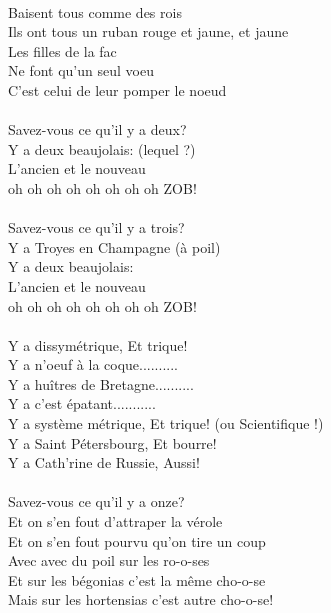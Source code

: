 
\\Baisent tous comme des rois
\\Ils ont tous un ruban rouge et jaune, et jaune
\\Les filles de la fac
\\Ne font qu'un seul voeu
\\C'est celui de leur pomper le noeud
\\\\Savez-vous ce qu'il y a deux? ~~~~~~~\bissimple
\\Y a deux beaujolais: (lequel ?)
\\L'ancien et le nouveau
\\oh oh oh oh oh oh oh oh ZOB!
\\\\Savez-vous ce qu'il y a trois? ~~~~~~~\bissimple
\\Y a Troyes en Champagne (à poil)
\\Y a deux beaujolais:
\\L'ancien et le nouveau
\\oh oh oh oh oh oh oh oh ZOB!
\\\\Y a dissymétrique, Et trique!
\\Y a n'oeuf à la coque..........
\\Y a huîtres de Bretagne..........
\\Y a c'est épatant...........
\\Y a système métrique, Et trique! (ou Scientifique !)
\\Y a Saint Pétersbourg, Et bourre!
\\Y a Cath'rine de Russie, Aussi!
\\\\Savez-vous ce qu'il y a onze? ~~~~~~~~~~~~~~\bissimple
\\Et on s'en fout d'attraper la vérole
\\Et on s'en fout pourvu qu'on tire un coup
\\Avec avec du poil sur les ro-o-ses
\\Et sur les bégonias c'est la même cho-o-se
\\Mais sur les hortensias c'est autre cho-o-se!

\breakpage